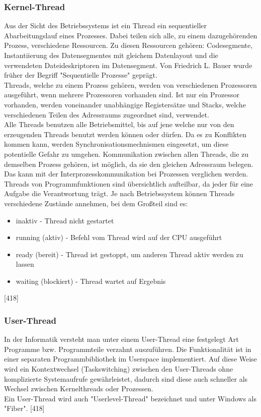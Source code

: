 \documentclass[12pt,a4paper]{report}
\begin{document}
\begin{onehalfspace}
\subsubsection{Kernel-Thread}
Aus der Sicht des Betriebssystems ist ein Thread ein sequentieller Abarbeitungslauf eines Prozesses. Dabei teilen sich alle, zu einem dazugehörenden Prozess, verschiedene Ressourcen. Zu diesen Ressourcen gehören: Codesegmente, Instantiierung des Datensegmentes mit gleichem Datenlayout und die verwendeten Dateideskriptoren im Datensegment. Von Friedrich L. Bauer wurde früher der Begriff "{}Sequentielle Prozesse{}" geprägt.\\

Threads, welche zu einem Prozess gehören, werden von verschiedenen Prozessoren ausgeführt, wenn mehrere Prozessoren vorhanden sind. Ist nur ein Prozessor vorhanden, werden voneinander unabhängige Registersätze und Stacks, welche verschiedenen Teilen des Adressraums zugeordnet sind, verwendet.\\

Alle Threads benutzen alle Betriebsmittel, bis auf jene welche nur von den erzeugenden Threads benutzt werden können oder dürfen. Da es zu Konflikten kommen kann, werden Synchronisationsmechnismen eingesetzt, um diese potentielle Gefahr zu umgehen.
Kommunikation zwischen allen Threads, die zu demselben Prozess gehören, ist möglich, da sie den gleichen Adressraum belegen. Das kann mit der Interprozesskommunikation bei Prozessen verglichen werden.\\

Threads von Programmfunktionen sind übersichtlich aufteilbar, da jeder für eine Aufgabe die Verantwortung trägt.  Je nach Betriebssystem können Threads verschiedene Zustände annehmen, bei dem Großteil sind es: 
\begin{itemize}
\item inaktiv -  Thread nicht gestartet
\item running (aktiv) - Befehl vom Thread wird auf der CPU ausgeführt
\item ready (bereit) - Thread ist gestoppt, um anderen Thread aktiv werden zu lassen
\item waiting (blockiert) - Thread wartet auf Ergebnis
\end{itemize}
[418]
\subsubsection{User-Thread}
In der Informatik versteht man unter einem User-Thread eine festgelegt Art Programme bzw. Programmteile verzahnt auszuführen. Die Funktionalität ist in einer separaten Programmbibliothek im Userspace implementiert. Auf diese Weise wird ein Kontextwechsel (Taskswitching) zwischen den User-Threads ohne komplizierte Systemaufrufe gewährleistet, dadurch sind diese auch schneller als Wechsel zwischen Kernelthreads oder Prozessen.\\
Ein User-Thread wird auch "{}Userlevel-Thread"{} bezeichnet und unter Windows als "{}Fiber"{}. [418]


\end{onehalfspace}
\end{document}
